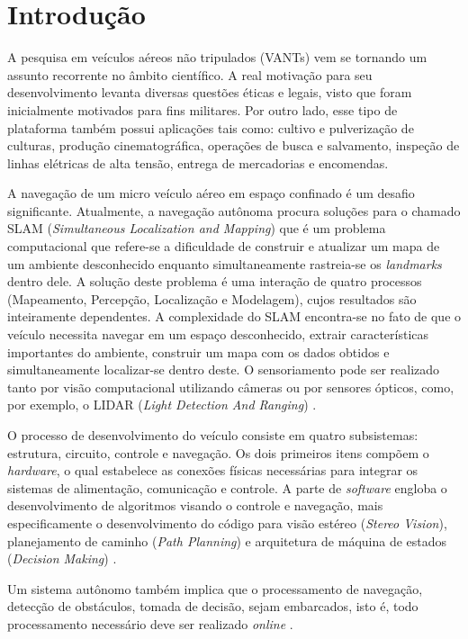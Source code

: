 \chapter{Introdução}
\label{Introducao}

A pesquisa em veículos aéreos não tripulados (VANTs) vem se tornando um assunto recorrente no âmbito científico. A real motivação para seu desenvolvimento levanta diversas questões éticas e legais, visto que foram inicialmente motivados para fins militares. Por outro lado, esse tipo de plataforma também possui aplicações tais como: cultivo e pulverização de culturas, produção cinematográfica, operações de busca e salvamento, inspeção de linhas elétricas de alta tensão, entrega de mercadorias e encomendas.

A navegação de um micro veículo aéreo em espaço confinado é um desafio significante. Atualmente, a navegação autônoma procura soluções para o chamado SLAM (\textit{Simultaneous Localization and Mapping}) \cite{Dissanayake2001} que é um problema computacional que refere-se a dificuldade de construir e atualizar um mapa de um ambiente desconhecido enquanto simultaneamente rastreia-se os \textit{landmarks} dentro dele. A solução deste problema é uma interação de quatro processos (Mapeamento, Percepção, Localização e Modelagem), cujos resultados são inteiramente dependentes. A complexidade do SLAM encontra-se no fato de que o veículo necessita navegar em um espaço desconhecido, extrair características importantes do ambiente, construir um mapa com os dados obtidos e simultaneamente localizar-se dentro deste. O sensoriamento pode ser realizado tanto por visão computacional utilizando câmeras ou por sensores ópticos, como, por exemplo, o LIDAR (\textit{Light Detection And Ranging}) \cite{Barry2015}. 

O processo de desenvolvimento do veículo consiste em quatro subsistemas: estrutura, circuito, controle e navegação. Os dois primeiros itens compõem o \textit{hardware}, o qual estabelece as conexões físicas necessárias para integrar os sistemas de alimentação, comunicação e controle. A parte de \textit{software} engloba o desenvolvimento de algoritmos visando o controle e navegação, mais especificamente o desenvolvimento do código para visão estéreo (\textit{Stereo Vision}), planejamento de caminho (\textit{Path Planning}) e arquitetura de máquina de estados (\textit{Decision Making}) \cite{Lemaire2007}.

Um sistema autônomo também implica que o processamento de navegação, detecção de obstáculos, tomada de decisão, sejam embarcados, isto é, todo processamento necessário deve ser realizado \textit{online} \cite{Ehsan2009}. 

